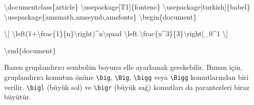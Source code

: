 \documentclass[
  letterpaper,
  DIV=11,
  numbers=noendperiod]{scrreprt}
\newenvironment{Shaded}{\begin{snugshade}}{\end{snugshade}}
\newcommand{\BuiltInTok}[1]{\textcolor[rgb]{0.00,0.23,0.31}{#1}}
\newcommand{\ExtensionTok}[1]{\textcolor[rgb]{0.00,0.23,0.31}{#1}}
\newcommand{\KeywordTok}[1]{\textcolor[rgb]{0.00,0.23,0.31}{#1}}
\newcommand{\NormalTok}[1]{\textcolor[rgb]{0.00,0.23,0.31}{#1}}
\newcommand{\SpecialCharTok}[1]{\textcolor[rgb]{0.37,0.37,0.37}{#1}}
\newcommand{\SpecialStringTok}[1]{\textcolor[rgb]{0.13,0.47,0.30}{#1}}
\begin{document}
\begin{Shaded}
\begin{Highlighting}[]
\BuiltInTok{\textbackslash{}documentclass}\NormalTok{\{}\ExtensionTok{article}\NormalTok{\}}
\BuiltInTok{\textbackslash{}usepackage}\NormalTok{[T1]\{}\ExtensionTok{fontenc}\NormalTok{\}}
\BuiltInTok{\textbackslash{}usepackage}\NormalTok{[turkish]\{}\ExtensionTok{babel}\NormalTok{\}}
\BuiltInTok{\textbackslash{}usepackage}\NormalTok{\{}\ExtensionTok{amsmath,amssymb,amsfonts}\NormalTok{\}}
\KeywordTok{\textbackslash{}begin}\NormalTok{\{}\ExtensionTok{document}\NormalTok{\}}

\SpecialStringTok{\textbackslash{}[}
\SpecialCharTok{\textbackslash{}left}\SpecialStringTok{(1+}\SpecialCharTok{\textbackslash{}frac}\SpecialStringTok{\{1\}\{n\}}\SpecialCharTok{\textbackslash{}right}\SpecialStringTok{)\^{}n}\SpecialCharTok{\textbackslash{}quad}
\SpecialCharTok{\textbackslash{}left}\SpecialStringTok{.}\SpecialCharTok{\textbackslash{}frac}\SpecialStringTok{\{x\^{}3\}\{3\}}\SpecialCharTok{\textbackslash{}right}\SpecialStringTok{|\_0\^{}1}
\SpecialStringTok{\textbackslash{}]}

\KeywordTok{\textbackslash{}end}\NormalTok{\{}\ExtensionTok{document}\NormalTok{\}}
\end{Highlighting}
\end{Shaded}

Bazen gruplandırıcı sembolün boyunu elle ayarlamak gerekebilir. Bunun
için, gruplandırıcı komutun önüne \texttt{\textbackslash{}big},
\texttt{\textbackslash{}Big}, \texttt{\textbackslash{}bigg} veya
\texttt{\textbackslash{}Bigg} komutlarından biri verilir.
\texttt{\textbackslash{}bigl} (büyük sol) ve
\texttt{\textbackslash{}bigr} (büyük sağ) komutları da parantezleri
biraz büyütür.
\end{document}
